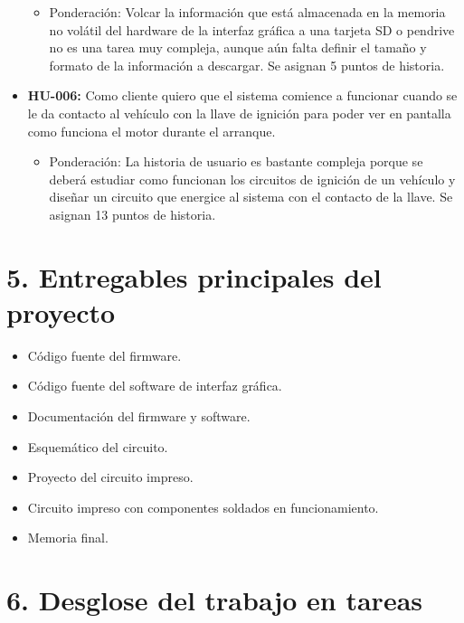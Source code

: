 \documentclass[11pt]{charter}
\begin{document}
\begin{itemize}
	\begin{itemize}
	\item Ponderación: Volcar la información que está almacenada en la memoria no volátil del hardware de la interfaz gráfica a una tarjeta SD o pendrive no es una tarea muy compleja, aunque aún falta definir el tamaño y formato de la información a descargar. Se asignan 5 puntos de historia.
	\end{itemize}
\item \textbf{HU-006:} Como cliente quiero que el sistema comience a funcionar cuando se le da contacto al vehículo con la llave de ignición para poder ver en pantalla como funciona el motor durante el arranque.
	\begin{itemize}
	\item Ponderación: La historia de usuario es bastante compleja porque se deberá estudiar como funcionan los circuitos de ignición de un vehículo y diseñar un circuito que energice al sistema con el contacto de la llave. Se asignan 13 puntos de historia.
	\end{itemize}
\end{itemize}

\section{5. Entregables principales del proyecto}
\label{sec:entregables}

\begin{itemize}
\item Código fuente del firmware.
\item Código fuente del software de interfaz gráfica.
\item Documentación del firmware y software.
\item Esquemático del circuito.
\item Proyecto del circuito impreso.
\item Circuito impreso con componentes soldados en funcionamiento.
\item Memoria final.
\end{itemize}

\section{6. Desglose del trabajo en tareas}
\label{sec:wbs}
\end{document}
